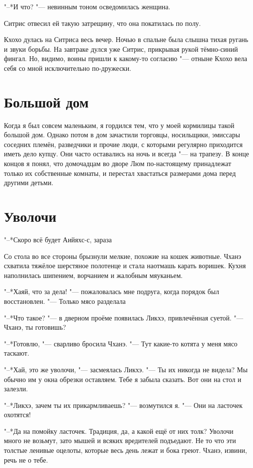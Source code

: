 "--*И что? "--- невинным тоном осведомилась женщина.

Ситрис отвесил ей такую затрещину, что она покатилась по полу.

Кхохо дулась на Ситриса весь вечер.
Ночью в спальне была слышна тихая ругань и звуки борьбы.
На завтраке дулся уже Ситрис, прикрывая рукой тёмно-синий фингал.
Но, видимо, воины пришли к какому-то согласию "--- отныне Кхохо вела себя со мной исключительно по-дружески.

\section{Большой дом}

Когда я был совсем маленьким, я гордился тем, что у моей кормилицы такой большой дом.
Однако потом в дом зачастили торговцы, носильщики, эмиссары соседних племён, разведчики и прочие люди, с которыми регулярно приходится иметь дело купцу.
Они часто оставались на ночь и всегда "--- на трапезу.
В конце концов я понял, что домочадцам во дворе Люм по-настоящему принадлежат только их собственные комнаты, и перестал хвастаться размерами дома перед другими детьми.

\section{Уволочи}

"--*Скоро всё будет\ldotst
Аийяхс-с, зараза\ldotse

Со стола во все стороны брызнули мелкие, похожие на кошек животные.
Чханэ схватила тяжёлое шерстяное полотенце и стала наотмашь карать воришек.
Кухня наполнилась шипением, ворчанием и жалобным мяуканьем.

"--*Хаяй, что за дела! "--- пожаловалась мне подруга, когда порядок был восстановлен.
"--- Только мясо разделала\ldotse

"--*Что такое? "--- в дверном проёме появилась Ликхэ, привлечённая суетой.
"--- Чханэ, ты готовишь?

"--*Готовлю, "--- сварливо бросила Чханэ.
"--- Тут какие-то котята у меня мясо таскают.

"--*Хай, это же уволочи, "--- засмеялась Ликхэ.
"--- Ты их никогда не видела?
Мы обычно им у окна обрезки оставляем.
Тебе я забыла сказать.
Вот они на стол и залезли.

"--*Ликхэ, зачем ты их прикармливаешь? "--- возмутился я.
"--- Они на ласточек охотятся!

"--*Да на помойку ласточек.
Традиция, да, а какой ещё от них толк?
Уволочи много не возьмут, зато мышей и всяких вредителей подъедают.
Не то что эти толстые ленивые оцелоты, которые весь день лежат и бока греют.
Чханэ, извини, речь не о тебе.

